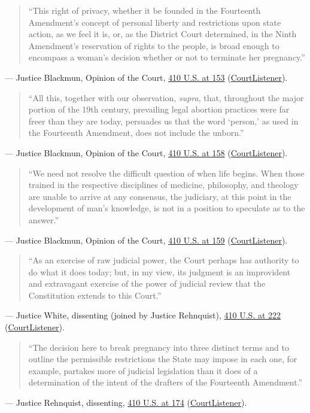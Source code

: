 \documentclass[12pt]{article}
\begin{document}
\begin{quote}
``This right of privacy, whether it be founded in the Fourteenth Amendment's concept of personal liberty and restrictions upon state action, as we feel it is, or, as the District Court determined, in the Ninth Amendment's reservation of rights to the people, is broad enough to encompass a woman's decision whether or not to terminate her pregnancy.''
\end{quote}
\noindent--- Justice Blackmun, Opinion of the Court, \href{https://supreme.justia.com/cases/federal/us/410/113/}{410 U.S. at 153} (\href{https://www.courtlistener.com/opinion/108713/roe-v-wade/}{CourtListener}).

\begin{quote}
``All this, together with our observation, \textit{supra}, that, throughout the major portion of the 19th century, prevailing legal abortion practices were far freer than they are today, persuades us that the word `person,' as used in the Fourteenth Amendment, does not include the unborn.''
\end{quote}
\noindent--- Justice Blackmun, Opinion of the Court, \href{https://supreme.justia.com/cases/federal/us/410/113/}{410 U.S. at 158} (\href{https://www.courtlistener.com/opinion/108713/roe-v-wade/}{CourtListener}).

\begin{quote}
``We need not resolve the difficult question of when life begins. When those trained in the respective disciplines of medicine, philosophy, and theology are unable to arrive at any consensus, the judiciary, at this point in the development of man's knowledge, is not in a position to speculate as to the answer.''
\end{quote}
\noindent--- Justice Blackmun, Opinion of the Court, \href{https://supreme.justia.com/cases/federal/us/410/113/}{410 U.S. at 159} (\href{https://www.courtlistener.com/opinion/108713/roe-v-wade/}{CourtListener}).

\begin{quote}
``As an exercise of raw judicial power, the Court perhaps has authority to do what it does today; but, in my view, its judgment is an improvident and extravagant exercise of the power of judicial review that the Constitution extends to this Court.''
\end{quote}
\noindent--- Justice White, dissenting (joined by Justice Rehnquist), \href{https://supreme.justia.com/cases/federal/us/410/179/}{410 U.S. at 222} (\href{https://www.courtlistener.com/opinion/108713/roe-v-wade/}{CourtListener}).

\begin{quote}
``The decision here to break pregnancy into three distinct terms and to outline the permissible restrictions the State may impose in each one, for example, partakes more of judicial legislation than it does of a determination of the intent of the drafters of the Fourteenth Amendment.''
\end{quote}
\noindent--- Justice Rehnquist, dissenting, \href{https://supreme.justia.com/cases/federal/us/410/113/}{410 U.S. at 174} (\href{https://www.courtlistener.com/opinion/108713/roe-v-wade/}{CourtListener}).
\end{document}
